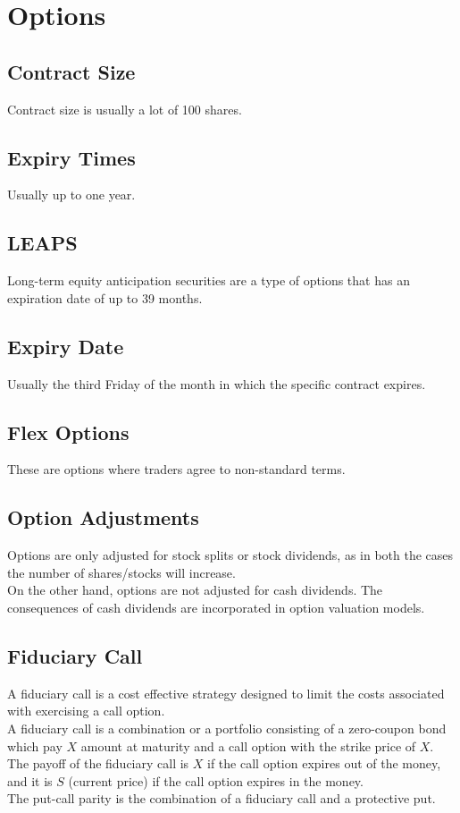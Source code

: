 \chapter{Options}

\section{Contract Size}
Contract size is usually a lot of 100 shares.

\section{Expiry Times}
Usually up to one year.

\section{LEAPS}
Long-term equity anticipation securities are a type of options that has an expiration date of up to 39 months.

\section{Expiry Date}
Usually the third Friday of the month in which the specific contract expires.

\section{Flex Options}
These are options where traders agree to non-standard terms.

\section{Option Adjustments}
Options are only adjusted for stock splits or stock dividends, as in both the cases the number of shares/stocks will increase.\\
On the other hand, options are not adjusted for cash dividends. The consequences of cash dividends are incorporated in option valuation models.

\section{Fiduciary Call}
A fiduciary call is a cost effective strategy designed to limit the costs associated with exercising a call option.\\
A fiduciary call is a combination or a portfolio consisting of a zero-coupon bond which pay $X$ amount at maturity and a call option with the strike price of $X$.
The payoff of the fiduciary call is $X$ if the call option expires out of the money, and it is $S$ (current price) if the call option expires in the money.\\
The put-call parity is the combination of a fiduciary call and a protective put.

